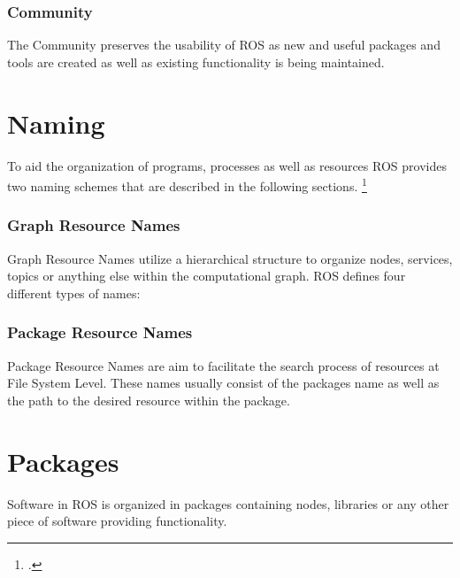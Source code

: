 \subsubsection{Community}
The Community preserves the usability of ROS as new and useful packages and tools are created as well as existing functionality is being maintained.

\section{Naming}
To aid the organization of programs, processes as well as resources ROS provides two naming schemes that are described in the following sections. \citereset\footcite{openSourceRoboticsFoundationConceptsNodate}

\subsubsection{Graph Resource Names}
Graph Resource Names utilize a hierarchical structure to organize nodes, services, topics or anything else within the computational graph. ROS defines four different types of names:

\subsubsection{Package Resource Names}
Package Resource Names are aim to facilitate the search process of resources at File System Level. These names usually consist of the packages name as well as the path to the desired resource within the package. 

\section{Packages}
Software in ROS is organized in packages containing nodes, libraries or any other piece of software providing functionality.

